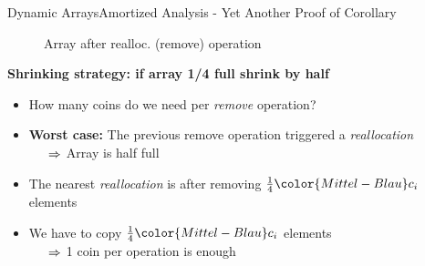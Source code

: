 
\begin{frame}{Dynamic Arrays}{Amortized Analysis -
    Yet Another Proof of Corollary}
  \vspace{-2.0em}
  \begin{figure}[!h]%
    \def\FSAsize{14}\def\FSAelements{0}%
    \def\FSAcopy{7}\def\FSAdelete{1}\def\FSAinsert{0}%
    \def\FSAcopyarrow{1}%
    \def\FSAinsertarrow{1}%
    \def\FSAlabelsize{\raisebox{1.75em}{$\begin{array}{c}
        {\color{Mittel-Blau}s_{i-1}-1}\\
        \text{old elements}
        \end{array}$}}%
    \def\FSAlabelinsertcapacity{removed elements}%
    \def\FSAlabelcapacity{${\color{Mittel-Blau}c_i}
      = \frac{1}{2} \cdot {\color{Mittel-Blau}c_{i-1}}$}%
    \vspace{-0.5em}%
    \caption{Array after realloc. (remove) operation}
    \label{fig:dynamic_fields:amortized_analysis:yapoc_array_shrink}
  \end{figure}
  \vspace*{-1.0em}
    \textbf{Shrinking strategy: if array 1/4 full shrink by half}
  \begin{itemize}
  \item
    How many coins do we need per \textit{remove} operation?
  \item
    \textbf{Worst case:}
    The previous remove operation triggered a \textit{reallocation}\\
    $\hspace{1.5em}\Rightarrow$ Array is half full
    \item
      The nearest \textit{reallocation} is after removing
      $\frac{1}{4} {\color{Mittel-Blau}c_i}$ elements
    \item
      We have to copy $\frac{1}{4} {\color{Mittel-Blau}c_i}$ elements\\
      $\hspace{1.5em}\Rightarrow$ 1 coin per operation is enough
  \end{itemize}
\end{frame}
